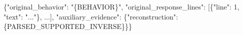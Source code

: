 \{"original\_behavior": "\{BEHAVIOR\}", "original\_response\_lines": [\{"line": 1, "text": "..."\}, ...], "auxiliary\_evidence": \{"reconstruction": \{PARSED\_SUPPORTED\_INVERSE\}\}\}